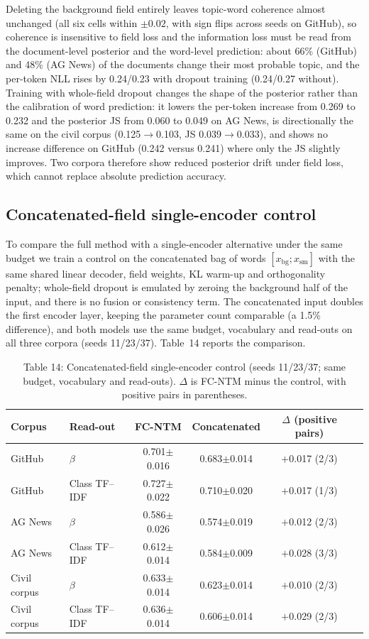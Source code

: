 \documentclass{article}
\begin{document}
Deleting the background field entirely leaves topic-word coherence almost unchanged (all six cells
within $\pm0.02$, with sign flips across seeds on GitHub), so coherence is insensitive to field
loss and the information loss must be read from the document-level posterior and the word-level
prediction: about 66\% (GitHub) and 48\% (AG News) of the documents change their most probable
topic, and the per-token NLL rises by 0.24/0.23 with dropout training (0.24/0.27 without).
Training with whole-field dropout changes the shape of the posterior rather than the calibration of
word prediction: it lowers the per-token increase from 0.269 to 0.232 and the posterior JS from
0.060 to 0.049 on AG News, is directionally the same on the civil corpus
(0.125$\to$0.103, JS 0.039$\to$0.033), and shows no increase difference on GitHub
(0.242 versus 0.241) where only the JS slightly improves. Two corpora therefore show reduced
posterior drift under field loss, which cannot replace absolute prediction accuracy.

\subsection{Concatenated-field single-encoder control}

To compare the full method with a single-encoder alternative under the same budget we train a
control on the concatenated bag of words $[x_{\mathrm{bg}};x_{\mathrm{sm}}]$ with the same shared
linear decoder, field weights, KL warm-up and orthogonality penalty; whole-field dropout is
emulated by zeroing the background half of the input, and there is no fusion or consistency
term. The concatenated input doubles the first encoder layer, keeping the parameter count
comparable (a 1.5\% difference), and both models use the same budget, vocabulary and read-outs
on all three corpora (seeds 11/23/37).
Table~14 reports the comparison.

\begin{table}[t]
\centering
\caption{Table 14: Concatenated-field single-encoder control (seeds 11/23/37; same budget, vocabulary and read-outs). $\Delta$ is FC-NTM minus the control, with positive pairs in parentheses.}
\label{tab:concat}
\small
\begin{tabular}{llcccc}
\toprule
Corpus & Read-out & FC-NTM & Concatenated & $\Delta$ (positive pairs) \\
\midrule
GitHub & $\beta$ & 0.701$\pm$0.016 & 0.683$\pm$0.014 & $+$0.017 (2/3) \\
GitHub & Class TF--IDF & 0.727$\pm$0.022 & 0.710$\pm$0.020 & $+$0.017 (1/3) \\
AG News & $\beta$ & 0.586$\pm$0.026 & 0.574$\pm$0.019 & $+$0.012 (2/3) \\
AG News & Class TF--IDF & 0.612$\pm$0.014 & 0.584$\pm$0.009 & $+$0.028 (3/3) \\
Civil corpus & $\beta$ & 0.633$\pm$0.014 & 0.623$\pm$0.014 & $+$0.010 (2/3) \\
Civil corpus & Class TF--IDF & 0.636$\pm$0.014 & 0.606$\pm$0.014 & $+$0.029 (2/3) \\
\bottomrule
\end{tabular}
\end{table}
\end{document}

